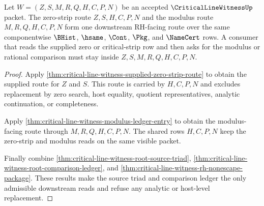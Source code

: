 \begin{theorem}
\label{thm:critical-line-witness-zero-strip-modulus-route}
Let $W=(Z,S,M,R,Q,H,C,P,N)$ be an accepted $\CriticalLineWitnessUp$ packet. The zero-strip route $Z,S,H,C,P,N$ and the modulus route $M,R,Q,H,C,P,N$ form one downstream RH-facing route over the same componentwise $\BHist$, $\hsame$, $\Cont$, $\Pkg$, and $\NameCert$ rows. A consumer that reads the supplied zero or critical-strip row and then asks for the modulus or rational comparison must stay inside $Z,S,M,R,Q,H,C,P,N$.
\end{theorem}
\begin{proof}
Apply \autoref{thm:critical-line-witness-supplied-zero-strip-route} to obtain the supplied route for $Z$ and $S$. This route is carried by $H,C,P,N$ and excludes replacement by zero search, host equality, quotient representatives, analytic continuation, or completeness.

Apply \autoref{thm:critical-line-witness-modulus-ledger-entry} to obtain the modulus-facing route through $M,R,Q,H,C,P,N$. The shared rows $H,C,P,N$ keep the zero-strip and modulus reads on the same visible packet.

Finally combine \autoref{thm:critical-line-witness-root-source-triad}, \autoref{thm:critical-line-witness-root-comparison-ledger}, and \autoref{thm:critical-line-witness-rh-nonescape-package}. These results make the source triad and comparison ledger the only admissible downstream reads and refuse any analytic or host-level replacement.
\end{proof}

